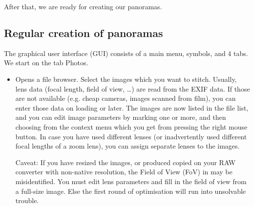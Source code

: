 After that, we are ready for creating our panoramas.


\subsection{Regular creation of panoramas}
\label{sec:landscapes:Hugin:regular}

The graphical user interface (GUI) consists of a main menu, symbols, and 4 tabs. We start on the tab Photos. 
\begin{itemize}
\item {} Opens a file browser. Select the images which you
  want to stitch. Usually, lens data (focal length, field of view,
  \ldots) are read from the EXIF data. If those are not available
  (e.g. cheap cameras, images scanned from film), you can enter those
  data on loading or later.  The images are now listed in the file
  list, and you can edit image parameters by marking one or more, and
  then choosing from the context menu which you get from pressing the
  right mouse button. In case you have used different lenses (or
  inadvertently used different focal lengths of a zoom lens), you can
  assign separate lenses to the images.

  Caveat: If you have resized the images, or produced copied on your
  RAW converter with non-native resolution, the Field of View (FoV) in
   may be misidentified. You must edit lens parameters and fill
  in the field of view from a full-size image. Else the first round of
  optimisation will run into unsolvable trouble. 
 

\end{itemize}
